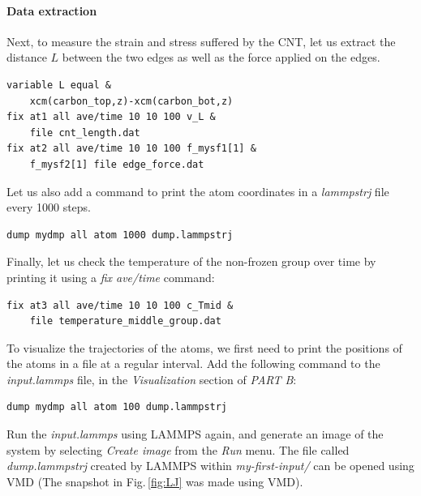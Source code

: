 \documentclass[9pt,tutorial]{livecoms}
\begin{document}
\paragraph{Data extraction}
Next, to measure the strain and stress suffered by the CNT, let us extract the distance $L$ between the two edges as well as the force applied on the edges.
{\normalsize \begin{verbatim}
variable L equal &
    xcm(carbon_top,z)-xcm(carbon_bot,z)
fix at1 all ave/time 10 10 100 v_L &
    file cnt_length.dat
fix at2 all ave/time 10 10 100 f_mysf1[1] &
    f_mysf2[1] file edge_force.dat
\end{verbatim}}
\noindent Let us also add a command to print the atom coordinates in a \textit{lammpstrj} file every 1000 steps.
{\normalsize \begin{verbatim}
dump mydmp all atom 1000 dump.lammpstrj
\end{verbatim}}
\noindent Finally, let us check the temperature of the non-frozen group over time by printing it using a \textit{fix ave/time} command:
{\normalsize \begin{verbatim}
fix at3 all ave/time 10 10 100 c_Tmid &
    file temperature_middle_group.dat
\end{verbatim}}

{\color{blue}
To visualize the trajectories of the atoms, we first need to print the positions of the atoms in a file at a regular interval. Add the following command to the \textit{input.lammps} file, in the \textit{Visualization} section of \textit{PART B}:}
{\normalsize \begin{verbatim}
dump mydmp all atom 100 dump.lammpstrj
\end{verbatim}}
{\color{blue}Run the \textit{input.lammps} using LAMMPS again, and generate an image of the system by selecting \textit{Create image} from the \textit{Run} menu. The file called \textit{dump.lammpstrj} created by LAMMPS within \textit{my-first-input/} can be opened using VMD (The snapshot in Fig.\,\ref{fig:LJ} was made using VMD).}
\end{document}
